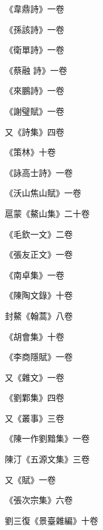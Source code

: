 \begin{pinyinscope}
 《韋鼎詩》一卷



 《孫該詩》一卷



 《衛單詩》一卷



 《蔡融
 詩》一卷



 《來鵬詩》一卷



 《謝璧賦》一卷



 又《詩集》四卷



 《策林》十卷



 《詠高士詩》一卷



 《沃山焦山賦》一卷



 扈蒙《鰲山集》二十卷



 《毛欽一文》二卷



 《張友正文》一卷



 《南卓集》一卷



 《陳陶文錄》十卷



 封鰲《翰蒿》八卷



 《胡會集》十卷



 《李商隱賦》一卷



 又《雜文》一卷



 《劉鄴集》四卷



 又《叢事》三卷



 《陳一作劉黯集》一卷



 陳汀《五源文集》三卷



 又《賦》一卷



 《張次宗集》六卷



 劉三復《景臺雜編》十卷




\end{pinyinscope}

